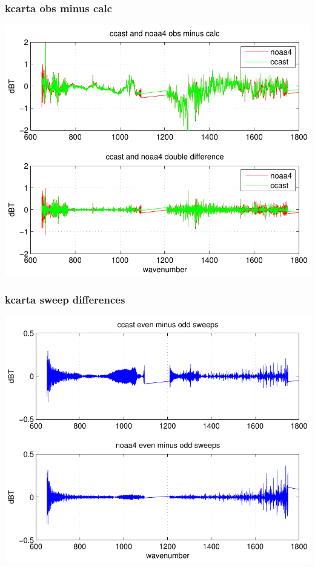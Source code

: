\documentclass[11pt]{beamer}
\begin{document}
\begin{frame}
\frametitle{kcarta obs minus calc}
\begin{center}
  \includegraphics[scale=0.7]{figures/kcarta_all_1.pdf}
\end{center}
\end{frame}
\begin{frame}
\frametitle{kcarta sweep differences}
\begin{center}
  \includegraphics[scale=0.7]{figures/kcarta_all_2.pdf}
\end{center}
\end{frame}
\end{document}
